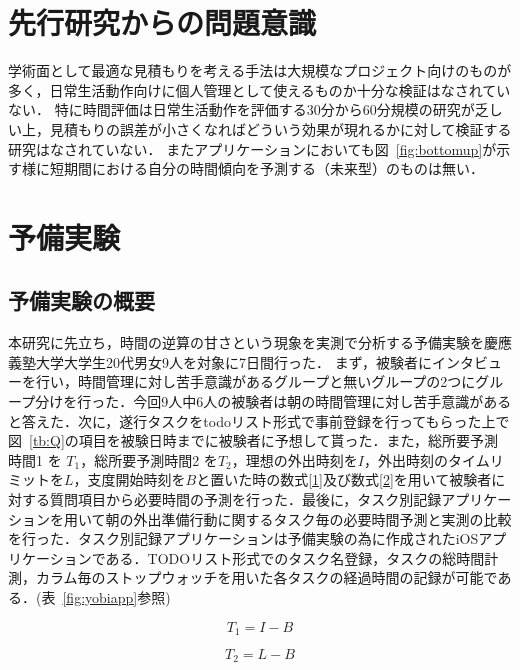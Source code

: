 \section{先行研究からの問題意識}
学術面として最適な見積もりを考える手法は大規模なプロジェクト向けのものが多く，日常生活動作向けに個人管理として使えるものか十分な検証はなされていない．
特に時間評価は日常生活動作を評価する30分から60分規模の研究が乏しい上，見積もりの誤差が小さくなればどういう効果が現れるかに対して検証する研究はなされていない．
またアプリケーションにおいても図~\ref{fig:bottomup}が示す様に短期間における自分の時間傾向を予測する（未来型）のものは無い．

\section{予備実験}
\subsection{予備実験の概要}
本研究に先立ち，時間の逆算の甘さという現象を実測で分析する予備実験を慶應義塾大学大学生20代男女9人を対象に7日間行った．
まず，被験者にインタビューを行い，時間管理に対し苦手意識があるグループと無いグループの2つにグループ分けを行った．今回9人中6人の被験者は朝の時間管理に対し苦手意識があると答えた．次に，遂行タスクをtodoリスト形式で事前登録を行ってもらった上で図~\ref{tb:Q}の項目を被験日時までに被験者に予想して貰った．また，総所要予測時間1 を $T_{1}$，総所要予測時間2 を$T_{2}$，理想の外出時刻を$I$，外出時刻のタイムリミットを$L$，支度開始時刻を$B$と置いた時の数式\ref{1}及び数式\ref{2}を用いて被験者に対する質問項目から必要時間の予測を行った．最後に，タスク別記録アプリケーションを用いて朝の外出準備行動に関するタスク毎の必要時間予測と実測の比較を行った．タスク別記録アプリケーションは予備実験の為に作成されたiOSアプリケーションである．TODOリスト形式でのタスク名登録，タスクの総時間計測，カラム毎のストップウォッチを用いた各タスクの経過時間の記録が可能である．(表~\ref{fig:yobiapp}参照)

\begin{equation}
\label{1}
 T_{1} = I - B 
\end{equation}

\begin{equation}
\label{2}
 T_{2} = L - B
\end{equation}

